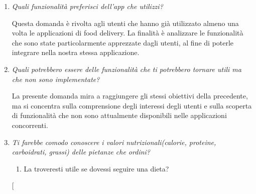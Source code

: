 \documentclass{article}
\begin{document}
\begin{enumerate}
\begin{tcolorbox}
        \end{tcolorbox}
    \item \textit{Quali funzionalità preferisci dell'app che utilizzi?}
        \begin{tcolorbox}[
            colframe=green,  %
            colback=white,  %
            sharp corners,  %
            boxrule=0.5pt,  %
            left=5pt,  %
            right=5pt,  %
            top=5pt,  %
            bottom=5pt  %
        ]
        Questa domanda è rivolta agli utenti che hanno già utilizzato almeno una volta le applicazioni di food delivery. La finalità è analizzare le funzionalità che sono state particolarmente apprezzate dagli utenti, al fine di poterle integrare nella nostra stessa applicazione.
        \end{tcolorbox}
    \item \textit{Quali potrebbero essere delle funzionalità che ti potrebbero tornare utili ma che non sono implementate?}
        \begin{tcolorbox}[
            colframe=green,  %
            colback=white,  %
            sharp corners,  %
            boxrule=0.5pt,  %
            left=5pt,  %
            right=5pt,  %
            top=5pt,  %
            bottom=5pt  %
        ]
        La presente domanda mira a raggiungere gli stessi obiettivi della precedente, ma si concentra sulla comprensione degli interessi degli utenti e sulla scoperta di funzionalità che non sono attualmente disponibili nelle applicazioni concorrenti.
        \end{tcolorbox}
    \item \textit{Ti farebbe comodo conoscere i valori nutrizionali(calorie, proteine, carboidrati, grassi) delle pietanze che ordini?}
        \begin{enumerate}
            \item La troveresti utile se dovessi seguire una dieta?
        \end{enumerate}
        \begin{tcolorbox}[

\end{tcolorbox}
\end{enumerate}
\end{document}
